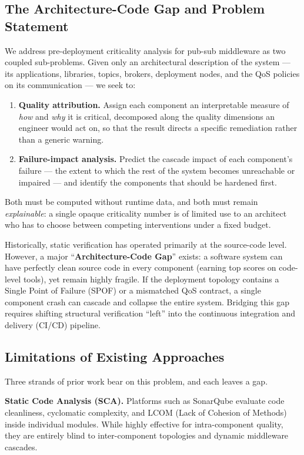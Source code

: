 \documentclass[review]{elsarticle}
\begin{document}
\subsection{The Architecture-Code Gap and Problem Statement}

We address pre-deployment criticality analysis for pub-sub middleware as two coupled sub-problems.
Given only an architectural description of the system --- its applications, libraries, topics,
brokers, deployment nodes, and the QoS policies on its communication --- we seek to:

\begin{enumerate}
\item \textbf{Quality attribution.} Assign each component an interpretable measure of \emph{how} and
  \emph{why} it is critical, decomposed along the quality dimensions an engineer would act on, so
  that the result directs a specific remediation rather than a generic warning.
\item \textbf{Failure-impact analysis.} Predict the cascade impact of each component's failure ---
  the extent to which the rest of the system becomes unreachable or impaired --- and identify the
  components that should be hardened first.
\end{enumerate}

Both must be computed without runtime data, and both must remain \emph{explainable}: a single opaque
criticality number is of limited use to an architect who has to choose between competing
interventions under a fixed budget.

Historically, static verification has operated primarily at the source-code level. However, a major
``\textbf{Architecture-Code Gap}'' exists: a software system can have perfectly clean source code in
every component (earning top scores on code-level tools), yet remain highly fragile. If the
deployment topology contains a Single Point of Failure (SPOF) or a mismatched QoS contract, a single
component crash can cascade and collapse the entire system. Bridging this gap requires shifting
structural verification ``left'' into the continuous integration and delivery (CI/CD) pipeline.

\subsection{Limitations of Existing Approaches}

Three strands of prior work bear on this problem, and each leaves a gap.

\textbf{Static Code Analysis (SCA).} Platforms such as SonarQube evaluate code cleanliness,
cyclomatic complexity, and LCOM (Lack of Cohesion of Methods) inside individual modules. While highly
effective for intra-component quality, they are entirely blind to inter-component topologies and
dynamic middleware cascades.
\end{document}
